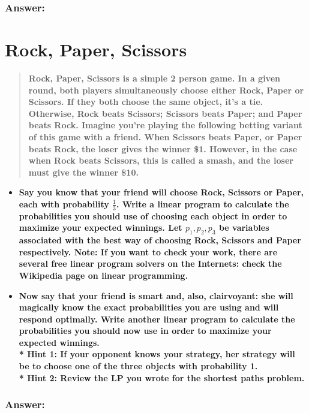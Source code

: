 \documentclass[titlepage]{article}\usepackage[]{graphicx}\usepackage[]{color}
\begin{document}
  \subsubsection{Answer:}
  \vspace{9cm}
\section{Rock, Paper, Scissors}
  \begin{quote}
    \textbf{Rock, Paper, Scissors is a simple 2 person game. In a given round,
    both players simultaneously choose either Rock, Paper or Scissors. If they
    both choose the same object, it’s a tie. Otherwise, Rock beats Scissors;
    Scissors beats Paper; and Paper beats Rock. Imagine you’re playing the
    following betting variant of this game with a friend. When Scissors beats
    Paper, or Paper beats Rock, the loser gives the winner \$1. However, in the case
    when Rock beats Scissors, this is called a \textbf{smash}, and the loser must give the
    winner \$10.}
  \end{quote}

  \begin{itemize}
    \item \textbf{Say you know that your friend will choose Rock, Scissors or
        Paper, each with probability $\frac{1}{3}$. Write a linear program to
        calculate the probabilities you should use of choosing each object in
        order to maximize your expected winnings. Let $p_1,p_2,p_3$ be variables
        associated with the best way of choosing Rock, Scissors and Paper
        respectively. Note: If you want to check your work, there are several free
        linear program solvers on the Internets: check the Wikipedia page on linear
        programming.} 
      \item \textbf{Now say that your friend is smart and, also,
        clairvoyant: she will magically know the exact probabilities you are
        using and will respond optimally. Write another linear program to
        calculate the probabilities you should now use in order to maximize your
        expected winnings. \\* Hint 1: If your opponent knows your strategy, her
        strategy will be to choose one of the three objects with probability 1.
      \\* Hint 2: Review the LP you wrote for the shortest paths problem.}
  \end{itemize}
  \subsubsection{Answer:}
\end{document}
